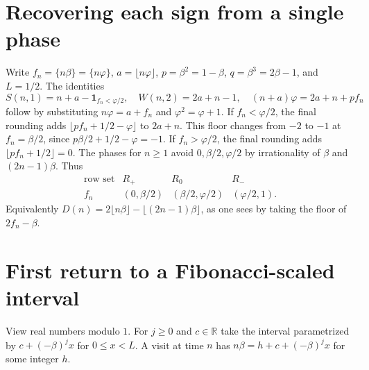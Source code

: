 \documentclass[11pt]{article}
\newcommand{\ph}{\varphi}
\newcommand{\fl}[1]{\lfloor #1\rfloor}
\newcommand{\fr}[1]{\{#1\}}
\begin{document}
\section{Recovering each sign from a single phase}
Write $f_n=\fr{n\beta}=\fr{n\ph}$, $a=\fl{n\ph}$,
$p=\beta^2=1-\beta$, $q=\beta^3=2\beta-1$, and $L=1/2$.
The identities
\[
 S(n,1)=n+a-\mathbf1_{f_n<\ph/2},\quad W(n,2)=2a+n-1,\quad
 (n+a)\ph=2a+n+p f_n
\]
follow by substituting $n\ph=a+f_n$ and $\ph^2=\ph+1$.
If $f_n<\ph/2$, the final rounding adds
$\fl{p f_n+1/2-\ph}$ to $2a+n$. This floor changes from $-2$ to $-1$
at $f_n=\beta/2$, since $p\beta/2+1/2-\ph=-1$.
If $f_n>\ph/2$, the final rounding adds $\fl{p f_n+1/2}=0$.
The phases for $n\ge1$ avoid $0,\beta/2,\ph/2$ by irrationality of
$\beta$ and $(2n-1)\beta$. Thus
\[
\begin{array}{c|ccc}
\text{row set}& R_+ & R_0 & R_-\\ \hline
 f_n & (0,\beta/2) & (\beta/2,\ph/2)&(\ph/2,1).
\end{array}
\]
Equivalently $D(n)=2\fl{n\beta}-\fl{(2n-1)\beta}$, as one sees
by taking the floor of $2f_n-\beta$.

\section{First return to a Fibonacci-scaled interval}
View real numbers modulo $1$. For $j\ge0$ and $c\in\mathbb R$ take the interval
parametrized by $c+(-\beta)^j x$ for $0\le x<L$. A visit at time $n$ has
$n\beta=h+c+(-\beta)^j x$ for some integer $h$.
\end{document}
